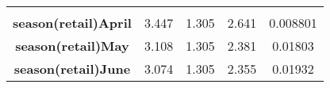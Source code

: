 \documentclass[]{book}
\theoremstyle{definition}
\theoremstyle{definition}
\theoremstyle{remark}
\begin{document}
\begin{longtable}[c]{@{}ccccc@{}}
\begin{minipage}[t]{0.12\columnwidth}
\strut\end{minipage}\tabularnewline
\begin{minipage}[t]{0.35\columnwidth}\centering\strut
\textbf{season(retail)April}
\strut\end{minipage} &
\begin{minipage}[t]{0.13\columnwidth}\centering\strut
3.447
\strut\end{minipage} &
\begin{minipage}[t]{0.15\columnwidth}\centering\strut
1.305
\strut\end{minipage} &
\begin{minipage}[t]{0.12\columnwidth}\centering\strut
2.641
\strut\end{minipage} &
\begin{minipage}[t]{0.12\columnwidth}\centering\strut
0.008801
\strut\end{minipage}\tabularnewline
\begin{minipage}[t]{0.35\columnwidth}\centering\strut
\textbf{season(retail)May}
\strut\end{minipage} &
\begin{minipage}[t]{0.13\columnwidth}\centering\strut
3.108
\strut\end{minipage} &
\begin{minipage}[t]{0.15\columnwidth}\centering\strut
1.305
\strut\end{minipage} &
\begin{minipage}[t]{0.12\columnwidth}\centering\strut
2.381
\strut\end{minipage} &
\begin{minipage}[t]{0.12\columnwidth}\centering\strut
0.01803
\strut\end{minipage}\tabularnewline
\begin{minipage}[t]{0.35\columnwidth}\centering\strut
\textbf{season(retail)June}
\strut\end{minipage} &
\begin{minipage}[t]{0.13\columnwidth}\centering\strut
3.074
\strut\end{minipage} &
\begin{minipage}[t]{0.15\columnwidth}\centering\strut
1.305
\strut\end{minipage} &
\begin{minipage}[t]{0.12\columnwidth}\centering\strut
2.355
\strut\end{minipage} &
\begin{minipage}[t]{0.12\columnwidth}\centering\strut
0.01932
\strut\end{minipage}\tabularnewline

\end{longtable}
\end{document}
